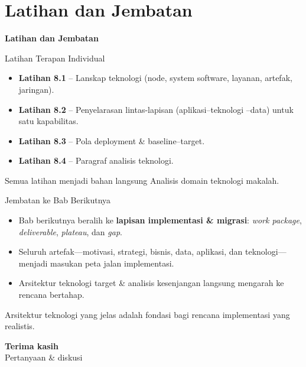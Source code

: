 \documentclass[aspectratio=169, table]{beamer}
\newcommand{\sectionframe}[1]{%
  \begin{frame}{\hfill}
    \centering
    \Huge{\textbf{#1}}
  \end{frame}
}
\newcommand{\takeaway}[1]{%
  \vspace{4pt}
  {\footnotesize #1}
}
\begin{document}
\section{Latihan dan Jembatan}
\sectionframe{Latihan dan Jembatan}

\begin{frame}{Latihan Terapan Individual}
  \vspace{8pt}
  \begin{itemize}
    \item \textbf{Latihan 8.1} -- Lanskap teknologi (node, system software,
          layanan, artefak, jaringan).
    \item \textbf{Latihan 8.2} -- Penyelarasan lintas-lapisan (aplikasi--teknologi
          --data) untuk satu kapabilitas.
    \item \textbf{Latihan 8.3} -- Pola deployment \& baseline--target.
    \item \textbf{Latihan 8.4} -- Paragraf analisis teknologi.
  \end{itemize}
  \takeaway{Semua latihan menjadi bahan langsung Analisis domain teknologi
  makalah.}
\end{frame}

\begin{frame}{Jembatan ke Bab Berikutnya}
  \vspace{8pt}
  \begin{itemize}
    \item Bab berikutnya beralih ke \textbf{lapisan implementasi \& migrasi}:
          \emph{work package}, \emph{deliverable}, \emph{plateau}, dan \emph{gap}.
    \item Seluruh artefak---motivasi, strategi, bisnis, data, aplikasi, dan
          teknologi---menjadi masukan peta jalan implementasi.
    \item Arsitektur teknologi target \& analisis kesenjangan langsung mengarah ke
          rencana bertahap.
  \end{itemize}
  \takeaway{Arsitektur teknologi yang jelas adalah fondasi bagi rencana
  implementasi yang realistis.}
\end{frame}

\begin{frame}{\hfill}
  \centering
  \Huge{\textbf{Terima kasih}}\\[8pt]
  \normalsize Pertanyaan \& diskusi
\end{frame}
\end{document}
